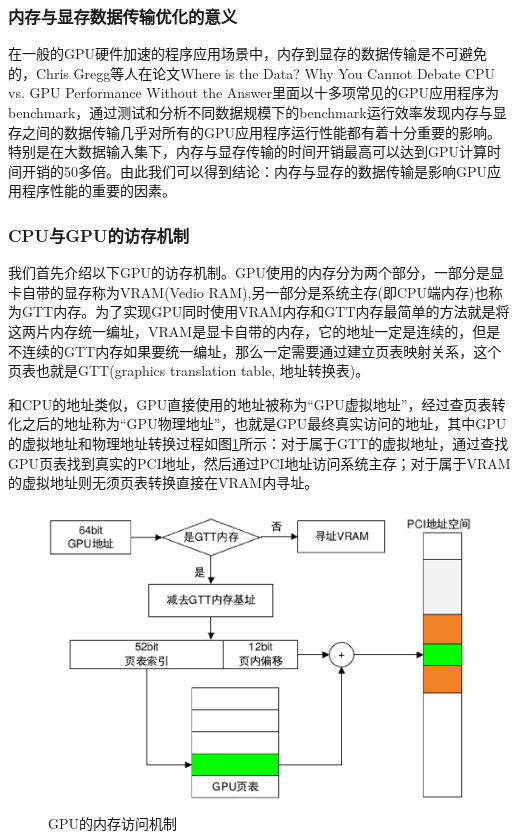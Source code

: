 \subsubsection{内存与显存数据传输优化的意义}

在一般的GPU硬件加速的程序应用场景中，内存到显存的数据传输是不可避免的，Chris Gregg等人在论文Where is the Data? Why You Cannot Debate CPU vs. GPU Performance Without the Answer\cite{Where-is-the-Data}里面以十多项常见的GPU应用程序为benchmark，通过测试和分析不同数据规模下的benchmark运行效率发现内存与显存之间的数据传输几乎对所有的GPU应用程序运行性能都有着十分重要的影响。特别是在大数据输入集下，内存与显存传输的时间开销最高可以达到GPU计算时间开销的50多倍。由此我们可以得到结论：内存与显存的数据传输是影响GPU应用程序性能的重要的因素。


\subsubsection{CPU与GPU的访存机制}

我们首先介绍以下GPU的访存机制。GPU使用的内存分为两个部分，一部分是显卡自带的显存称为VRAM(Vedio RAM),另一部分是系统主存(即CPU端内存)也称为GTT内存。为了实现GPU同时使用VRAM内存和GTT内存最简单的方法就是将这两片内存统一编址，VRAM是显卡自带的内存，它的地址一定是连续的，但是不连续的GTT内存如果要统一编址，那么一定需要通过建立页表映射关系，这个页表也就是GTT(graphics translation table, 地址转换表)。

和CPU的地址类似，GPU直接使用的地址被称为“GPU虚拟地址”，经过查页表转化之后的地址称为“GPU物理地址”，也就是GPU最终真实访问的地址，其中GPU的虚拟地址和物理地址转换过程如图\ref{fig:gpu-mmu}所示：对于属于GTT的虚拟地址，通过查找GPU页表找到真实的PCI地址，然后通过PCI地址访问系统主存；对于属于VRAM的虚拟地址则无须页表转换直接在VRAM内寻址。

\begin{figure}[H] 
  \centering
  \includegraphics[width=12cm,height=8cm]{figures/chap03/gpu-mmu}
  \caption{GPU的内存访问机制}
  \label{fig:gpu-mmu}
\end{figure}

